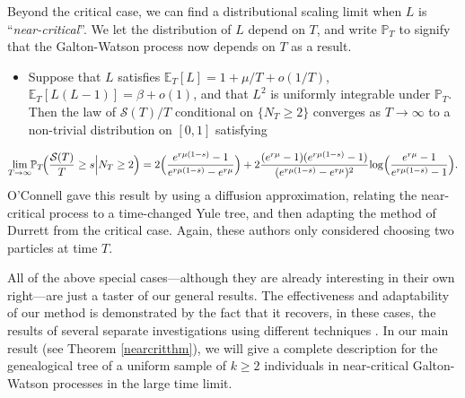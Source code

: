 \documentclass{article}
\theoremstyle{plain}
\theoremstyle{definition}
\renewcommand{\P}{\mathbb{P}}
\newcommand{\E}{\mathbb{E}}
\renewcommand{\S}{\mathcal{S}}
\begin{document}
Beyond the critical case, we can find a distributional scaling limit when $L$ is ``\emph{near-critical}''. We let the distribution of $L$ depend on $T$, and write $\P_T$ to signify that the Galton-Watson process now depends on $T$ as a result.
\begin{itemize}
\item Suppose that $L$ satisfies $\E_T[L] = 1+\mu/T+o(1/T)$, $\E_T[L(L-1)]=\beta+o(1)$, and that $L^2$ is uniformly integrable under $\P_T$. Then the law of $\S(T)/T$ conditional on $\{N_T\ge 2\}$ converges as $T\to\infty$ to a non-trivial distribution on $[0,1]$ satisfying
\end{itemize}
\[\lim_{T\to\infty} \hspace{-1mm}\P_T\hspace{-0.5mm}\Big(\frac{\S(T)}{T} \ge s \Big| N_T\ge 2\Big) = 2\Big(\frac{e^{r\mu(1-s)}-1}{e^{r\mu(1-s)}-e^{r\mu}}\Big) + 2 \frac{(e^{r\mu}-1)(e^{r\mu(1-s)}-1)}{(e^{r\mu(1-s)}-e^{r\mu})^2} \hspace{-0.5mm}\log\hspace{-0.5mm}\Big(\frac{e^{r\mu}-1}{e^{r\mu(1-s)}-1}\Big).\]
O'Connell \cite[Theorem 2.3]{oconnell:genealogy_mrca} gave this result by using a diffusion approximation, relating the near-critical process to a time-changed Yule tree, and then adapting the method of Durrett \cite{durrett:genealogy} from the critical case. Again, these authors only considered choosing two particles at time $T$.


All of the above special cases---although they are already interesting in their own right---are just a taster of our general results. The effectiveness and adaptability of our method is demonstrated by the fact that it recovers, in these cases, the results of several separate investigations using different techniques \cite{athreya:coalescence, durrett:genealogy, lambert:coalescence_GW, oconnell:genealogy_mrca}. In our main result (see Theorem \ref{nearcritthm}), we will give a complete description for the genealogical tree of a uniform sample of $k\geq2$ individuals in near-critical Galton-Watson processes in the large time limit.
\end{document}
